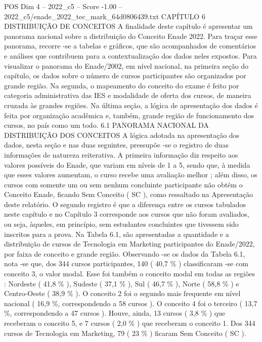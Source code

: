 \begin{textsample}{POS Dim 4 – 2022\_c5 – Score -1.00 – 2022\_c5/enade\_2022\_tec\_mark\_64d0806439.txt}  \label{ex:f4_pos_281}
CAPÍTULO 6 DISTRIBUIÇÃO DE CONCEITOS A finalidade deste capítulo é apresentar um panorama nacional sobre a distribuição do Conceito Enade 2022.
Para traçar esse panorama, recorre -se a tabelas e gráficos, que são acompanhados de comentários e análises que contribuem para a contextualização dos dados neles expostos.
Para visualizar o panorama do Enade/2002, em nível nacional, na primeira seção do capítulo, os dados sobre o número de cursos participantes são organizados por grande região.
Na segunda, o mapeamento do conceito do exame é feito por categoria administrativa das IES e modalidade de oferta dos cursos, de maneira cruzada às grandes regiões.
Na última seção, a lógica de apresentação dos dados é feita por organização acadêmica e, também, grande região de funcionamento dos cursos, no país como um todo. 6.1 PANORAMA NACIONAL DA DISTRIBUIÇÃO DOS CONCEITOS A lógica adotada na apresentação dos dados, nesta seção e nas duas seguintes, pressupõe -se o registro de duas informações de natureza reiterativa.
A primeira informação diz respeito aos valores possíveis do Enade, que variam em níveis de 1 a 5, sendo que, à medida que esses valores aumentam, o curso recebe uma avaliação melhor ; além disso, os cursos com somente um ou sem nenhum concluinte participante não obtêm o Conceito Enade, ficando Sem Conceito ( SC ), como ressaltado na Apresentação deste relatório.
O segundo registro é que a diferença entre os cursos tabulados neste capítulo e no Capítulo 3 corresponde aos cursos que não foram avaliados, ou seja, àqueles, em princípio, sem estudantes concluintes que tivessem sido inscritos para a prova.
Na Tabela 6.1, são apresentadas a quantidade e a distribuição de cursos de Tecnologia em Marketing participantes do Enade/2022, por faixa de conceito e grande região.
Observando -se os dados da Tabela 6.1, nota -se que, dos 344 cursos participantes, 140 ( 40,7 \% ) classificaram -se com conceito 3, o valor modal.
Esse foi também o conceito modal em todas as regiões : Nordeste ( 41,8 \% ), Sudeste ( 37,1 \% ), Sul ( 46,7 \% ), Norte ( 58,8 \% ) e Centro-Oeste ( 38,9 \% ).
O conceito 2 foi o segundo mais frequente em nível nacional ( 16,9 \%, correspondendo a 58 cursos ).
O conceito 4 foi o terceiro ( 13,7 \%, correspondendo a 47 cursos ).
Houve, ainda, 13 cursos ( 3,8 \% ) que receberam o conceito 5, e 7 cursos ( 2,0 \% ) que receberam o conceito 1.
Dos 344 cursos de Tecnologia em Marketing, 79 ( 23 \% ) ficaram Sem Conceito ( SC ).

\end{textsample}
